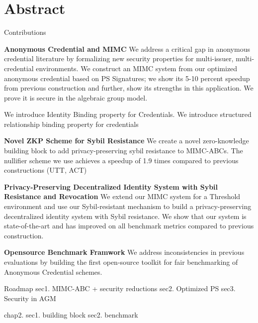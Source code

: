 \chapter*{Abstract}

Contributions

\textbf{Anonymous Credential and MIMC}
We address a critical gap in anonymous credential literature by formalizing new security properties for multi-issuer, multi-credential environments. 
We construct an MIMC system from our optimized anonymous credential based on PS Signatures; we show its 5-10 percent speedup from previous construction and further, show its strengths in this application. We prove it is secure in the algebraic group model.

We introduce Identity Binding property for Credentials. 
We introduce structured relationship binding property for credentials



\textbf{Novel ZKP Scheme for Sybil Resistance}
We create a novel zero-knowledge building block to add privacy-preserving sybil resistance to MIMC-ABCs. The nullifier scheme we use achieves a speedup of 1.9 times compared to previous constructions (UTT, ACT)


\textbf{Privacy-Preserving Decentralized Identity System with Sybil Resistance and Revocation}
We extend our MIMC system for a Threshold environment and use our Sybil-resistant mechanism to build a privacy-preserving decentralized identity system with Sybil resistance. We show that our system is state-of-the-art and has improved on all benchmark metrics compared to previous construction. 



\textbf{Opensource Benchmark Framwork}
We address inconsistencies in previous evaluations by building the first open-source toolkit for fair benchmarking of Anonymous Credential schemes. 


Roadmap
sec1. MIMC-ABC + security reductions
sec2. Optimized PS
sec3. Security in AGM

chap2. 
sec1. building block
sec2. benchmark

